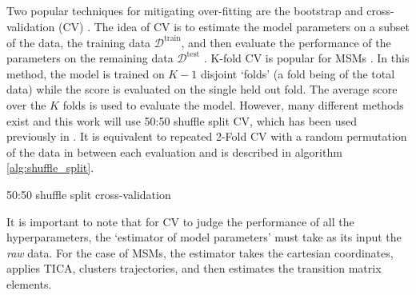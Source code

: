 Two popular techniques for mitigating over-fitting \cite{friedman2001elements} are the bootstrap \cite{efronIntroductionBootstrap1993} and cross-validation (CV) \cite{arlotSurveyCrossvalidationProcedures2009}.  The idea of CV is to estimate the model parameters on a subset of the data, the training data $\mathcal{D}^{\mathrm{train}}$, and then evaluate the performance of the parameters on the remaining data $\mathcal{D}^{\mathrm{test}}$ \cite{friedman2001elements}. K-fold CV is popular for MSMs \cite{schererVariationalSelectionFeatures2019}\cite{mcgibbonVariationalCrossvalidationSlow2015}. In this method, the model is trained on $K-1$ disjoint `folds' (a fold being  of the total data) while the score is evaluated on the single held out fold. The average score over the $K$ folds is used to evaluate the model. However, many different methods exist \cite{arlotSurveyCrossvalidationProcedures2009} and this work will use 50:50 shuffle split CV, which has been used previously in  \cite{chenDynamicConformationalLandscape2019}\cite{husicOptimizedParameterSelection2016}. It is equivalent to repeated 2-Fold CV with a random permutation of the data in between each evaluation and is described in algorithm \ref{alg:shuffle_split}. 

\begin{algorithm}\label{alg:shuffle_split}
\DontPrintSemicolon
{}

\BlankLine
{}
\caption{50:50 shuffle split cross-validation}
\end{algorithm}
It is important to note that for CV to judge the performance of all the hyperparameters, the `estimator of model parameters' must take as its input the \emph{raw} data. \cite{friedman2001elements} For the case of MSMs, the estimator takes the cartesian coordinates, applies TICA, clusters trajectories, and then estimates the transition matrix elements.  

